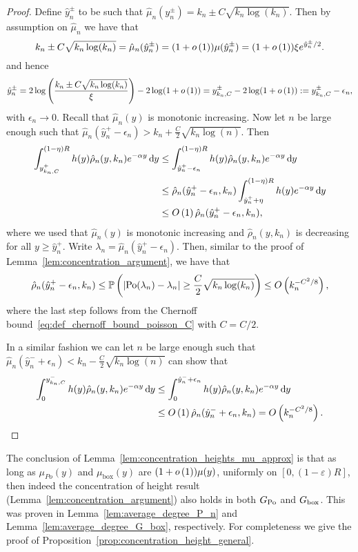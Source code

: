 \begin{appendices}
\begin{proof}
Define $\hat{y}_n^\pm$ to be such that $\hat{\mu}_n(y_n^\pm) = k_n \pm C \sqrt{k_n \log(k_n)}$. Then by assumption on $\hat{\mu}_n$ we have that
\[
	k_n \pm C \sqrt{k_n \log(k_n)} = \hat{\mu}_n(\hat{y}_n^\pm) = (1+o\left(1\right)) \mu(\hat{y}_n^\pm)
	= (1+o\left(1\right)) \xi e^{\hat{y}_n^\pm/2}.
\]
and hence
\[
	\hat{y}_n^\pm = 2\log\left(\frac{k_n \pm C \sqrt{k_n \log(k_n)}}{\xi}\right) - 2\log(1+o\left(1\right))
	= y_{k_n,C}^\pm - 2\log(1+o\left(1\right)) := y_{k_n,C}^\pm - \epsilon_n,
\]
with $\epsilon_n \to 0$. Recall that $\hat{\mu}_n(y)$ is monotonic increasing. Now let $n$ be large enough such that  $\hat{\mu}_n(\hat{y}_n^+ - \epsilon_n) > k_n + \frac{C}{2}\sqrt{k_n \log(n)}$. Then 
\begin{align*}
	\int_{y_{k_n,C}^+}^{(1-\eta)R} h(y) \hat{\rho}_n(y,k_n) e^{-\alpha y} \operatorname{\mathrm{d}\hspace{-2pt}} y
	&\le \int_{\hat{y}_n^+ - \epsilon_n}^{(1-\eta)R} h(y) \hat{\rho}_n(y,k_n) e^{-\alpha y} \operatorname{\mathrm{d}\hspace{-2pt}} y\\
	&\le \hat{\rho}_n(\hat{y}_n^+ - \epsilon_n,k_n) \int_{\hat{y}_n^+ + \eta}^{(1-\eta)R} h(y) e^{-\alpha y} \operatorname{\mathrm{d}\hspace{-2pt}} y\\
	&\le O\left(1\right) \hat{\rho}_n(\hat{y}_n^+ - \epsilon_n,k_n),
\end{align*}
where we used that $\hat{\mu}_n(y)$ is monotonic increasing and $\hat{\rho}_n(y,k_n)$ is decreasing for all $y \ge \hat{y}_n^+$. Write $\lambda_n = \hat{\mu}_n(\hat{y}_n^+ - \epsilon_n)$. Then, similar to the proof of Lemma~\ref{lem:concentration_argument}, we have that
\[
	\hat{\rho}_n(\hat{y}_n^+ - \epsilon_n,k_n)
	\le \mathbb{P}\left(\left|{\mathrm{Po}}(\lambda_n) - \lambda_n\right| \ge \frac{C}{2} \sqrt{k_n \log(k_n)}\right)
	\le O\left(k_n^{-C^2/8}\right),
\]
where the last step follows from the Chernoff bound~\eqref{eq:def_chernoff_bound_poisson_C} with $C = C/2$.

In a similar fashion we can let $n$ be large enough such that
$\hat{\mu}_n(\hat{y}_n^- + \epsilon_n) < k_n - \frac{C}{2}\sqrt{k_n \log(n)}$ can show that
\begin{align*}
	\int_0^{y_{k_n,C}^-} h(y) \hat{\rho}_n(y,k_n) e^{-\alpha y} \operatorname{\mathrm{d}\hspace{-2pt}} y
	&\le \int_0^{\hat{y}_n^- + \epsilon_n} h(y) \hat{\rho}_n(y,k_n) e^{-\alpha y} \operatorname{\mathrm{d}\hspace{-2pt}} y\\
	&\le O\left(1\right) \hat{\rho}_n(\hat{y}_n^- + \epsilon_n,k_n) = O\left(k_n^{-C^2/8}\right).
\end{align*}
\end{proof}

The conclusion of Lemma~\ref{lem:concentration_heights_mu_approx} is that as long as $\mu_{Po}(y)$ and $\mu_{\mathrm{box}}(y)$ are $(1+o\left(1\right))\mu(y)$, uniformly on $[0,(1-\varepsilon)R]$, then indeed the concentration of height result (Lemma~\ref{lem:concentration_argument}) also holds in both $G_{{\mathrm{Po}}}$ and $G_{\mathrm{box}}$. This was proven in Lemma~\ref{lem:average_degree_P_n} and Lemma~\ref{lem:average_degree_G_box}, respectively. For completeness we give the proof of Proposition~\ref{prop:concentration_height_general}.


\end{appendices}
